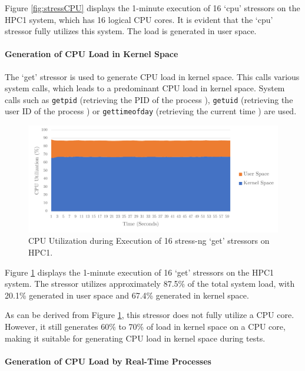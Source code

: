 Figure \ref{fig:stressCPU} displays the 1-minute execution of 16 `cpu' stressors on the HPC1 system, which has 16 logical CPU cores. It is evident that the `cpu' stressor fully utilizes this system. The load is generated in user space.

\paragraph{Generation of CPU Load in Kernel Space}
The `get' stressor is used to generate CPU load in kernel space. This calls various system calls, which leads to a predominant CPU load in kernel space. System calls such as \texttt{getpid} (retrieving the PID of the process \cite{stress06}), \texttt{getuid} (retrieving the user ID of the process \cite{stress07}) or \texttt{gettimeofday} (retrieving the current time \cite{stress08}) are used.

\begin{figure}[h!]
    \centering
    \includegraphics[width=1\linewidth]{figures/method/stress2.pdf}
    \caption{CPU Utilization during Execution of 16 stress-ng `get' stressors on HPC1.}
    \label{fig:stressGET}
\end{figure}

Figure \ref{fig:stressGET} displays the 1-minute execution of 16 `get' stressors on the HPC1 system. The stressor utilizes approximately 87.5\% of the total system load, with 20.1\% generated in user space and 67.4\% generated in kernel space.

As can be derived from Figure \ref{fig:stressGET}, this stressor does not fully utilize a CPU core. However, it still generates 60\% to 70\% of load in kernel space on a CPU core, making it suitable for generating CPU load in kernel space during tests.

\paragraph{Generation of CPU Load by Real-Time Processes}

